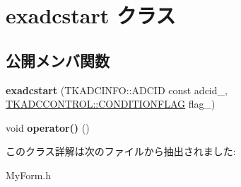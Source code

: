 \hypertarget{classexadcstart}{}\section{exadcstart クラス}
\label{classexadcstart}
\subsection*{公開メンバ関数}
\begin{DoxyCompactItemize}
\item 
\mbox{\label{classexadcstart_aebb1382ce90d77c855319da9087fdf25}} 
{\bfseries exadcstart} (T\+K\+A\+D\+C\+I\+N\+F\+O\+::\+A\+D\+C\+ID const adcid\+\_\+, \hyperlink{class_t_k_a_d_c_c_o_n_t_r_o_l_a4ec8bb3e68a489f7a757d08a855ffb61}{T\+K\+A\+D\+C\+C\+O\+N\+T\+R\+O\+L\+::\+C\+O\+N\+D\+I\+T\+I\+O\+N\+F\+L\+AG} flag\+\_\+)
\item 
\mbox{\label{classexadcstart_aaf643294d3a2081a502affb98baf7d8d}} 
void {\bfseries operator()} ()
\end{DoxyCompactItemize}


このクラス詳解は次のファイルから抽出されました\+:\begin{DoxyCompactItemize}
\item 
My\+Form.\+h\end{DoxyCompactItemize}
